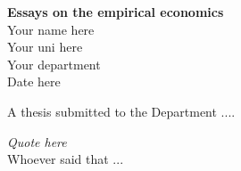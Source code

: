 \thispagestyle{empty}
\begin{center}
\vspace{1cm}
\normalsize
\singlespacing

{\Large\textbf{Essays on the empirical economics}}
\doublespacing
\vspace*{2in} \mbox{} \\
\normalsize %
 Your name here %
\vspace*{1in} \mbox{} \\
Your uni here \\
Your department
\vspace*{0.4in} \mbox{} \\
Date here %
\vspace*{1.4in} \mbox{} 

\small{A thesis submitted to the Department ....\\}
\end{center} 

\newpage

\begin{flushright}
 \textit{Quote here} \\
Whoever said that ...
\end{flushright}
